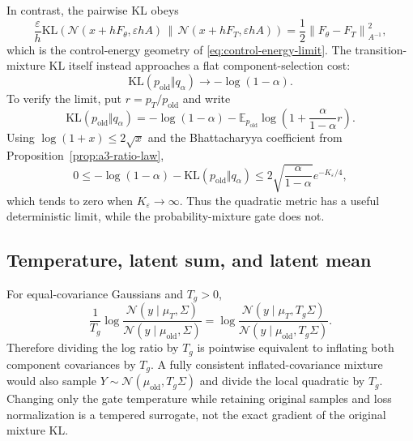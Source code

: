 \documentclass[11pt,a4paper]{article}
\newcommand{\E}{\mathbb{E}}
\newcommand{\N}{\mathcal{N}}
\newcommand{\KL}{\mathrm{KL}}
\newcommand{\norm}[1]{\left\lVert #1 \right\rVert}
\theoremstyle{plain}
\theoremstyle{definition}
\begin{document}
In contrast, the pairwise KL obeys
\begin{equation}
\frac{\varepsilon}{h}
\KL\!\left(
  \N(x+hF_\theta,\varepsilon hA)
  \,\middle\Vert\,
  \N(x+hF_T,\varepsilon hA)
\right)
=
\frac12\norm{F_\theta-F_T}_{A^{-1}}^2,
\label{eq:a3-pairwise-control}
\end{equation}
which is the control-energy geometry of \eqref{eq:control-energy-limit}.  The transition-mixture
KL itself instead approaches a flat component-selection cost:
\begin{equation}
\KL(p_{\mathrm{old}}\Vert q_\alpha)
\longrightarrow
-\log(1-\alpha).
\label{eq:a3-mixture-flat-limit}
\end{equation}
To verify the limit, put $r=p_T/p_{\mathrm{old}}$ and write
\begin{equation}
\KL(p_{\mathrm{old}}\Vert q_\alpha)
=
-\log(1-\alpha)
-\E_{p_{\mathrm{old}}}
\log\!\left(
  1+\frac{\alpha}{1-\alpha}r
\right).
\label{eq:a3-mixture-limit-expansion}
\end{equation}
Using $\log(1+x)\le2\sqrt{x}$ and the Bhattacharyya coefficient from
Proposition~\ref{prop:a3-ratio-law},
\begin{equation}
0
\le
-\log(1-\alpha)
-\KL(p_{\mathrm{old}}\Vert q_\alpha)
\le
2\sqrt{\frac{\alpha}{1-\alpha}}e^{-K_\varepsilon/4},
\label{eq:a3-mixture-limit-bound}
\end{equation}
which tends to zero when $K_\varepsilon\to\infty$.
Thus the quadratic metric has a useful deterministic limit, while the probability-mixture gate
does not.

\subsection{Temperature, latent sum, and latent mean}

For equal-covariance Gaussians and $T_g>0$,
\begin{equation}
\frac{1}{T_g}
\log\frac{\N(y\mid\mu_T,\Sigma)}
         {\N(y\mid\mu_{\mathrm{old}},\Sigma)}
=
\log\frac{\N(y\mid\mu_T,T_g\Sigma)}
         {\N(y\mid\mu_{\mathrm{old}},T_g\Sigma)}.
\label{eq:a3-temperature-covariance}
\end{equation}
Therefore dividing the log ratio by $T_g$ is pointwise equivalent to inflating both component
covariances by $T_g$.  A fully consistent inflated-covariance mixture would also sample
$Y\sim\N(\mu_{\mathrm{old}},T_g\Sigma)$ and divide the local quadratic by $T_g$.  Changing only
the gate temperature while retaining original samples and loss normalization is a tempered
surrogate, not the exact gradient of the original mixture KL.
\end{document}
